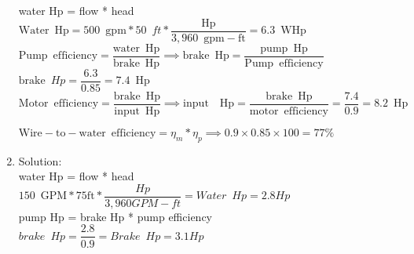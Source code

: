 \begin{enumerate}
water Hp = flow * head\\
 \vspace{0.2cm}
$\mathrm{Water} \enspace \mathrm{Hp} = 500 \enspace \mathrm{gpm}*50 \enspace ft*\dfrac{\mathrm{Hp}}{3,960 \enspace \mathrm{gpm-ft}}=\boxed{ 6.3 \enspace \mathrm{WHp}}$\\ 
  \vspace{0.2cm}
$\mathrm{Pump \enspace efficiency} =\dfrac{\mathrm{water \enspace Hp}}{\mathrm{brake \enspace Hp}} \implies \mathrm{brake \enspace Hp}=\dfrac{\mathrm{pump \enspace Hp}}{\mathrm{Pump \enspace efficiency}}$ \\
  \vspace{0.2cm}
$\textrm{brake} \enspace Hp = \dfrac{6.3}{0.85}=\boxed{7.4 \enspace \mathrm{Hp}}$\\
  \vspace{0.2cm}
$\mathrm{Motor \enspace efficiency} =\dfrac{\mathrm{brake \enspace Hp}}{\mathrm{input \enspace Hp}} \implies \mathrm{input \enspace \enspace Hp}=\dfrac{\mathrm{brake \enspace Hp}}{\mathrm{motor \enspace efficiency}}= \dfrac{7.4}{0.9}=\boxed{8.2 \enspace \mathrm{Hp}}$\\
  \vspace{0.2cm}
  
 \vspace{0.2cm}
$\mathrm{Wire-to-water} \enspace \mathrm{efficiency}=\eta_m * \eta_p \implies 0.9 \times 0.85 \times 100=\boxed{77 \%}$

\item  Solution:\\
\vspace{0.4cm}
water Hp = flow * head\\
$150 \enspace \mathrm{GPM}*75\mathrm{ft}*\dfrac{Hp}{3,960 GPM-ft}=\boxed{Water \enspace Hp = 2.8Hp}$\\
\vspace{0.4cm}
pump Hp = brake Hp * pump efficiency\\
$brake \enspace Hp = \dfrac{2.8}{0.9}=\boxed{Brake \enspace Hp=3.1Hp}$
 \vspace{0.2cm}

\end{enumerate}


